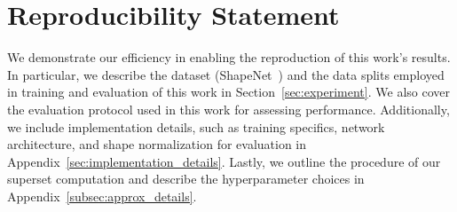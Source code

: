 \section{Reproducibility Statement}
We demonstrate our efficiency in enabling the reproduction of this work's results.
%
In particular, we describe the dataset (ShapeNet~\cite{chang2015shapenet}) and the data splits employed in training and evaluation of this work in Section~\ref{sec:experiment}.
%
We also cover the evaluation protocol used in this work for assessing performance.
%
Additionally, we include implementation details, such as training specifics, network architecture, and shape normalization for evaluation in Appendix~\ref{sec:implementation_details}.
%
Lastly, we outline the procedure of our superset computation and describe the hyperparameter choices in Appendix~\ref{subsec:approx_details}.